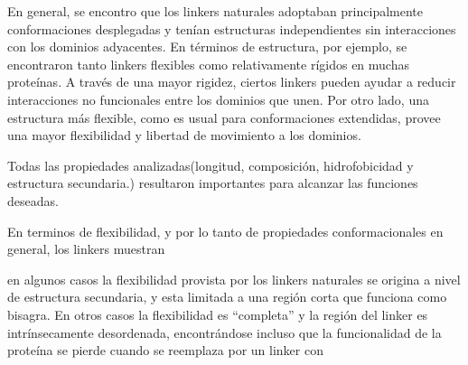 


En general, se encontro que los linkers naturales adoptaban principalmente conformaciones desplegadas y tenían estructuras independientes sin interacciones con los dominios adyacentes.
En términos de estructura, por ejemplo, se encontraron tanto linkers flexibles como relativamente rígidos en muchas proteínas.
A través de una mayor rigidez, ciertos linkers pueden ayudar a reducir interacciones no funcionales entre los dominios que unen. 
Por otro lado, una estructura más flexible, como es usual para conformaciones extendidas, provee una mayor flexibilidad y libertad de movimiento a los dominios.






Todas las propiedades analizadas(longitud, composición, hidrofobicidad y estructura secundaria.) resultaron importantes para alcanzar las funciones deseadas.



En terminos de flexibilidad, y por lo tanto de propiedades conformacionales en general, los linkers muestran 

en algunos casos la flexibilidad provista por los linkers naturales se origina a nivel de estructura secundaria, y esta limitada a una región corta que funciona como bisagra.
En otros casos la flexibilidad es ``completa'' y la región del linker es intrínsecamente desordenada\cite{luo2010flexibility}, 
encontrándose incluso que la funcionalidad de la proteína se pierde cuando se reemplaza por un linker con \cite{hrycyna1998structural}

